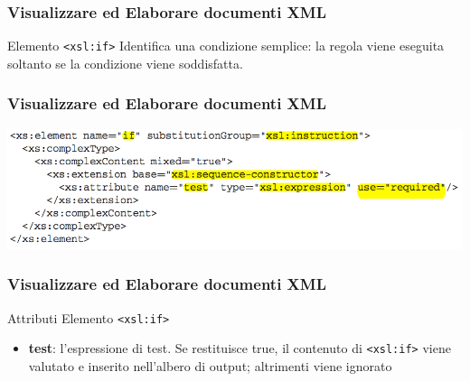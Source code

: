 \begin{frame}
    \frametitle{Visualizzare ed Elaborare documenti XML}
    \addtocounter{nframe}{1}
    

     \begin{block}{Elemento \texttt{<xsl:if>}}
        Identifica una condizione semplice: la regola viene eseguita soltanto se la condizione viene soddisfatta.
     \end{block}

\end{frame}

\begin{frame}
    \frametitle{Visualizzare ed Elaborare documenti XML}
    \addtocounter{nframe}{1}
    
    \begin{center}
        \includegraphics[width=.9\textwidth]{imgs/Schema-if.png}
    \end{center}

\end{frame}

\begin{frame}
    \frametitle{Visualizzare ed Elaborare documenti XML}
    \addtocounter{nframe}{1}
    

     \begin{block}{Attributi Elemento \texttt{<xsl:if>}}
         \begin{itemize}
             \item \textbf{test}: l’espressione di test. Se restituisce true, il contenuto di \texttt{<xsl:if>} viene valutato e inserito nell’albero di output; altrimenti viene ignorato
        \end{itemize}
     \end{block}
    
\end{frame}

